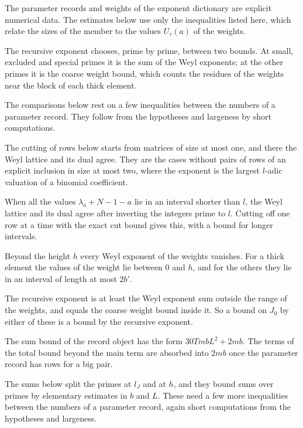 The parameter records and weights of the exponent dictionary are explicit numerical data. The
estimates below use only the inequalities listed here, which relate the sizes of the member to the
values $U_\tau(a)$ of the weights.

The recursive exponent chooses, prime by prime, between two bounds. At small, excluded and special
primes it is the sum of the Weyl exponents; at the other primes it is the coarse weight bound, which
counts the residues of the weights near the block of each thick element.

The comparisons below rest on a few inequalities between the numbers of a parameter record. They
follow from the hypotheses and largeness by short computations.

The cutting of rows below starts from matrices of size at most one, and there the Weyl lattice and its
dual agree. They are the cases without pairs of rows of an explicit inclusion in size at most two,
where the exponent is the largest $l$-adic valuation of a binomial coefficient.

When all the values $\lambda_a+N-1-a$ lie in an interval shorter than $l$, the Weyl lattice and its
dual agree after inverting the integers prime to $l$. Cutting off one row at a time with the exact cut
bound gives this, with a bound for longer intervals.

Beyond the height $h$ every Weyl exponent of the weights vanishes. For a thick element the values of
the weight lie between $0$ and $h$, and for the others they lie in an interval of length at most $2b'$.

The recursive exponent is at least the Weyl exponent sum outside the range of the weights, and equals
the coarse weight bound inside it. So a bound on $J_0$ by either of these is a bound by the recursive
exponent.

The sum bound of the record object has the form $30TmbL^2+2mb$. The terms of the total bound beyond the
main term are absorbed into $2mb$ once the parameter record has rows for a big pair.

The sums below split the primes at $l_J$ and at $h$, and they bound sums over primes by elementary
estimates in $b$ and $L$. These need a few more inequalities between the numbers of a parameter
record, again short computations from the hypotheses and largeness.

